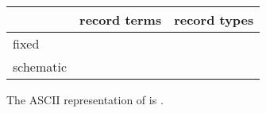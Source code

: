 \begin{isabellebody}
\begin{isamarkuptext}
  \begin{center}
  \begin{tabular}{l|l|l}
    & record terms & record types \\ \hline
    fixed & \isa{{\isaliteral{22}{\isachardoublequote}}{\isaliteral{5C3C6C706172723E}{\isasymlparr}}x\ {\isaliteral{3D}{\isacharequal}}\ a{\isaliteral{2C}{\isacharcomma}}\ y\ {\isaliteral{3D}{\isacharequal}}\ b{\isaliteral{5C3C72706172723E}{\isasymrparr}}{\isaliteral{22}{\isachardoublequote}}} & \isa{{\isaliteral{22}{\isachardoublequote}}{\isaliteral{5C3C6C706172723E}{\isasymlparr}}x\ {\isaliteral{3A}{\isacharcolon}}{\isaliteral{3A}{\isacharcolon}}\ A{\isaliteral{2C}{\isacharcomma}}\ y\ {\isaliteral{3A}{\isacharcolon}}{\isaliteral{3A}{\isacharcolon}}\ B{\isaliteral{5C3C72706172723E}{\isasymrparr}}{\isaliteral{22}{\isachardoublequote}}} \\
    schematic & \isa{{\isaliteral{22}{\isachardoublequote}}{\isaliteral{5C3C6C706172723E}{\isasymlparr}}x\ {\isaliteral{3D}{\isacharequal}}\ a{\isaliteral{2C}{\isacharcomma}}\ y\ {\isaliteral{3D}{\isacharequal}}\ b{\isaliteral{2C}{\isacharcomma}}\ {\isaliteral{5C3C646F74733E}{\isasymdots}}\ {\isaliteral{3D}{\isacharequal}}\ m{\isaliteral{5C3C72706172723E}{\isasymrparr}}{\isaliteral{22}{\isachardoublequote}}} &
      \isa{{\isaliteral{22}{\isachardoublequote}}{\isaliteral{5C3C6C706172723E}{\isasymlparr}}x\ {\isaliteral{3A}{\isacharcolon}}{\isaliteral{3A}{\isacharcolon}}\ A{\isaliteral{2C}{\isacharcomma}}\ y\ {\isaliteral{3A}{\isacharcolon}}{\isaliteral{3A}{\isacharcolon}}\ B{\isaliteral{2C}{\isacharcomma}}\ {\isaliteral{5C3C646F74733E}{\isasymdots}}\ {\isaliteral{3A}{\isacharcolon}}{\isaliteral{3A}{\isacharcolon}}\ M{\isaliteral{5C3C72706172723E}{\isasymrparr}}{\isaliteral{22}{\isachardoublequote}}} \\
  \end{tabular}
  \end{center}

  \noindent The ASCII representation of  is .


\end{isamarkuptext}
\end{isabellebody}
